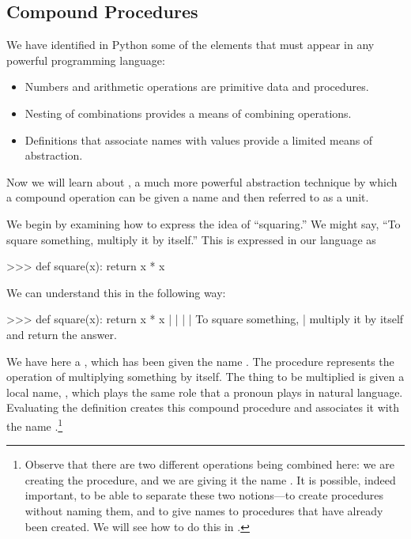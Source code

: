 \subsection{Compound Procedures}
\label{Section 1.1.4}

We have identified in Python some of the elements that must appear in any
powerful programming language:

\begin{itemize}
\item
Numbers and arithmetic operations are primitive data and procedures.

\item
Nesting of combinations provides a means of combining operations.

\item
Definitions that associate names with values provide a limited means of
abstraction.
\end{itemize}

\noindent
Now we will learn about , a much more powerful
abstraction technique by which a compound operation can be given a name and
then referred to as a unit.

We begin by examining how to express the idea of ``squaring.''  We might say,
``To square something, multiply it by itself.''  This is expressed in our
language as

\begin{codeBlock}
>>> def square(x): return x * x
\end{codeBlock}

\noindent
We can understand this in the following way:

\begin{syntaxForm}
>>> def square(x):        return x * x
     |    |                 |      |
     To square something,   |   multiply it by  itself
                           and return the answer.
\end{syntaxForm}

\noindent
We have here a , which has been given the name
.  The procedure represents the operation of multiplying something
by itself.  The thing to be multiplied is given a local name, , which
plays the same role that a pronoun plays in natural language.  Evaluating the
definition creates this compound procedure and associates it with the name
.\footnote{Observe that there are two different operations being
combined here: we are creating the procedure, and we are giving it the name
.  It is possible, indeed important, to be able to separate these
two notions---to create procedures without naming them, and to give names to
procedures that have already been created.  We will see how to do this in
.}

